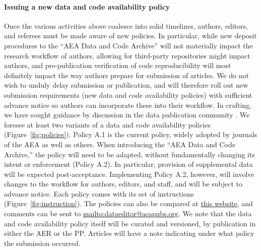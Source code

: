 \documentclass[AEJ]{AEA}
\begin{document}
\paragraph{Issuing a new data and code availability policy} Once the various activities above coalesce into solid timelines, authors, editors, and referees must be made aware of new policies. In particular, while new deposit procedures to the ``AEA Data and Code Archive'' will not materially impact the research workflow of authors, allowing for third-party repositories might impact authors, and pre-publication verification of code reproducibility will most definitely impact the way authors prepare for submission of articles. We do not wish to unduly delay submission or publication, and will therefore roll out new submission requirements (new data and code availability policies) with sufficient advance notice so authors can incorporate these into their workflow. In crafting, we have sought guidance by discussion in the data publication community \citep[][e.g.]{HrynaszkiewiczStandardisingHarmonisingResearch2017}. We foresee at least two variants of a data and code availability policies (Figure~\ref{fig:policies}). Policy A.1 is the current policy, widely adopted by journals of the AEA as well as others. When introducing the ``AEA Data and Code Archive,'' the policy will need to be adapted, without fundamentally changing its intent or enforcement (Policy A.2). In particular, provision of supplemental data will be expected post-acceptance. Implementing Policy A.2, however, will involve changes to the workflow for authors, editors, and staff, and will be subject to advance notice. Each policy comes with its set of instructions  (Figure~\ref{fig:instruction}). The policies can also be compared at \href{https://docs.google.com/spreadsheets/d/1khrXxnmKC7Llj9vH17r1KEkN0hcTVqZnQloretcOwDA/edit?usp=sharing}{this website}, and comments can be sent to \url{mailto:dataeditor@aeapubs.org}. We note that the data and code availability policy itself will be curated and versioned, by publication in either the AER or the PP. Articles will have a note indicating under what policy the submission occurred. 
\end{document}
